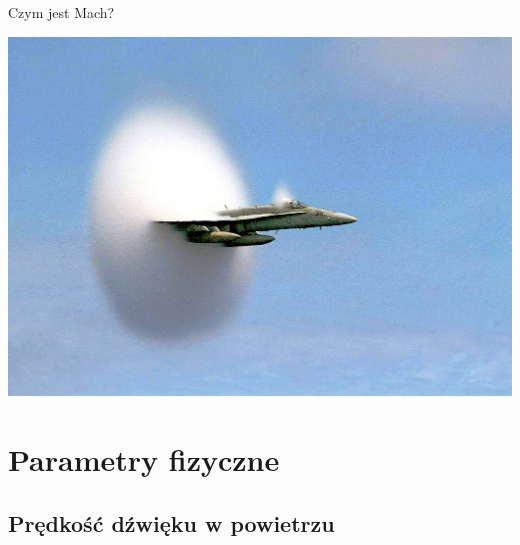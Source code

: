 \documentclass{beamer}
\begin{document}
\begin{frame}{Czym jest Mach?}

	\includegraphics[width=\linewidth]{mach.jpg}

\end{frame}

\section{Parametry fizyczne}

\subsection{Prędkość dźwięku w powietrzu}
\end{document}
